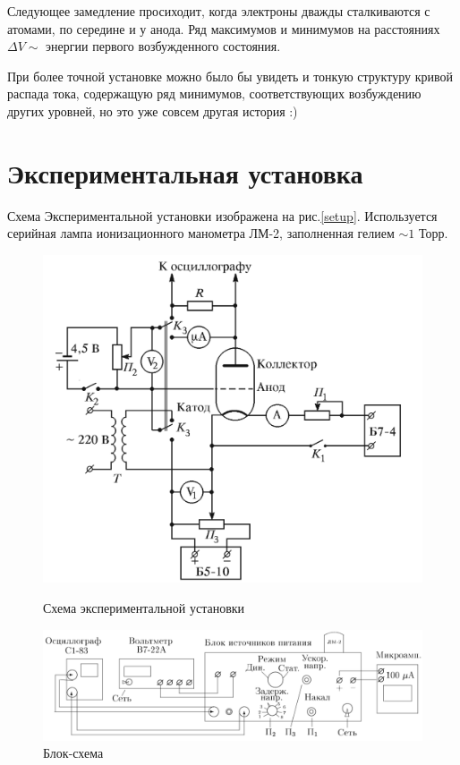 \documentclass[a4paper]{article}
\begin{document}
Следующее замедление просиходит, когда электроны дважды сталкиваются с атомами, по середине и у анода.
Ряд максимумов и минимумов на расстояниях $\Delta V \sim $ энергии первого возбужденного состояния.

При более точной установке можно было бы увидеть и тонкую структуру кривой распада тока, содержащую 
ряд минимумов, соответствующих возбуждению других уровней, но это уже совсем другая история :)

\section{Экспериментальная установка}

Схема Экспериментальной установки изображена на рис.\ref{setup}. Используется серийная лампа ионизационного
манометра ЛМ-2, заполненная гелием $\sim 1$ Торр. 

\begin{figure}[H]
	\begin{center}
	\begin{minipage}[h]{0.4\linewidth}
	\includegraphics[width=1\linewidth]{setup.png}
	\caption{Схема экспериментальной установки} 
	\label{setup}
	\end{minipage}
	\hfill 
	\begin{minipage}[h]{0.59\linewidth}
	\includegraphics[width=1\linewidth]{block.png}
	\caption{Блок-схема}
	\label{block}
    \end{minipage}
	\end{center}
\end{figure}
\end{document}
